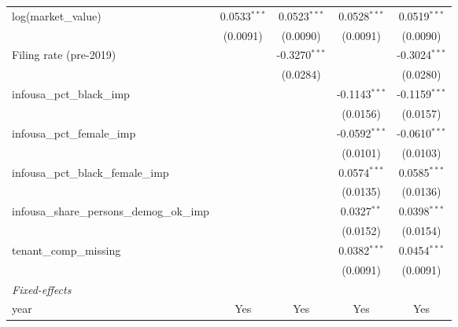 \begin{tabular}{lcccc}
   log(market\_value)                                      & 0.0533$^{***}$  & 0.0523$^{***}$  & 0.0528$^{***}$  & 0.0519$^{***}$\\   
                                                           & (0.0091)        & (0.0090)        & (0.0091)        & (0.0090)\\   
   Filing rate (pre-2019)                                  &                 & -0.3270$^{***}$ &                 & -0.3024$^{***}$\\   
                                                           &                 & (0.0284)        &                 & (0.0280)\\   
   infousa\_pct\_black\_imp                                &                 &                 & -0.1143$^{***}$ & -0.1159$^{***}$\\   
                                                           &                 &                 & (0.0156)        & (0.0157)\\   
   infousa\_pct\_female\_imp                               &                 &                 & -0.0592$^{***}$ & -0.0610$^{***}$\\   
                                                           &                 &                 & (0.0101)        & (0.0103)\\   
   infousa\_pct\_black\_female\_imp                        &                 &                 & 0.0574$^{***}$  & 0.0585$^{***}$\\   
                                                           &                 &                 & (0.0135)        & (0.0136)\\   
   infousa\_share\_persons\_demog\_ok\_imp                 &                 &                 & 0.0327$^{**}$   & 0.0398$^{***}$\\   
                                                           &                 &                 & (0.0152)        & (0.0154)\\   
   tenant\_comp\_missing                                   &                 &                 & 0.0382$^{***}$  & 0.0454$^{***}$\\   
                                                           &                 &                 & (0.0091)        & (0.0091)\\   
   \midrule
   \emph{Fixed-effects}\\
   year                                                    & Yes             & Yes             & Yes             & Yes\\  

\end{tabular}
